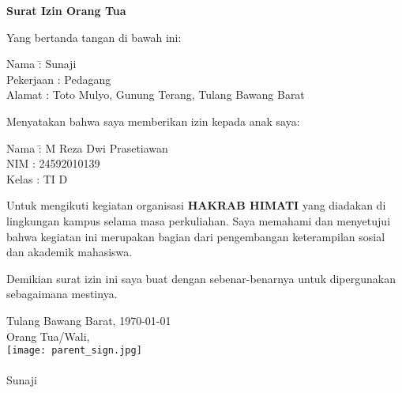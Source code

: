 \documentclass[a4paper,12pt]{article}
\begin{document}
\begin{center}
    \Large\textbf{Surat Izin Orang Tua}
\end{center}

\vspace{0.5cm}

\noindent
Yang bertanda tangan di bawah ini:

\vspace{0.2cm}

\begin{tabbing}
    Nama \hspace{2.2cm} \= : Sunaji \\
    Pekerjaan \> : Pedagang \\
    Alamat \> : Toto Mulyo, Gunung  Terang, Tulang Bawang Barat
\end{tabbing}

\vspace{0.5cm}

\noindent
Menyatakan bahwa saya memberikan izin kepada anak saya:

\vspace{0.2cm}

\begin{tabbing}
    Nama \hspace{2.2cm} \= : M Reza Dwi Prasetiawan\\
    NIM \> : 24592010139 \\
    Kelas \> : TI D
\end{tabbing}

\vspace{0.5cm}

\noindent
Untuk mengikuti kegiatan organisasi \textbf{HAKRAB HIMATI} yang diadakan di lingkungan kampus selama masa perkuliahan. Saya memahami dan menyetujui bahwa kegiatan ini merupakan bagian dari pengembangan keterampilan sosial dan akademik mahasiswa.

\vspace{0.5cm}

\noindent
Demikian surat izin ini saya buat dengan sebenar-benarnya untuk dipergunakan sebagaimana mestinya.

\vspace{1cm}

\begin{flushright}
    Tulang Bawang Barat, \today\\
    Orang Tua/Wali,\\
    \vspace{1cm} %
    \texttt{[image: parent\_sign.jpg]} \\ %
    \underline{\hspace{6cm}} \\ %
    Sunaji
\end{flushright}
\end{document}
